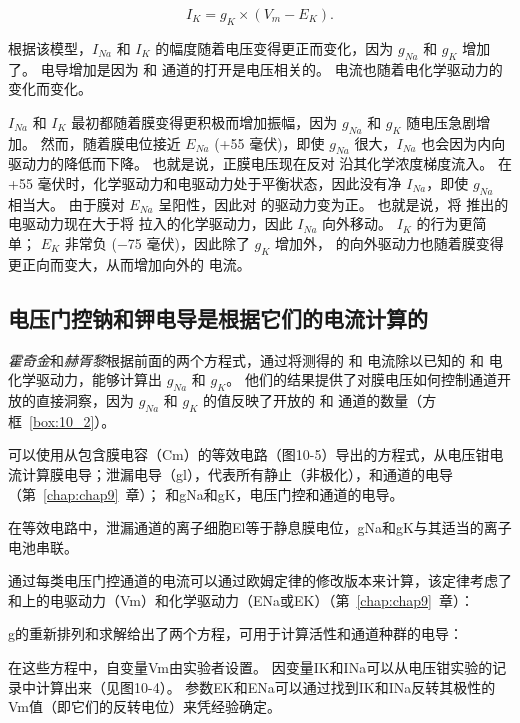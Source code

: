 \begin{equation}
	I_K = g_K \times (V_m - E_K).
\end{equation}


根据该模型，$I_{Na}$ 和 $I_K$ 的幅度随着电压变得更正而变化，因为 $g_{Na}$ 和 $g_K$ 增加了。
电导增加是因为  和  通道的打开是电压相关的。
电流也随着电化学驱动力的变化而变化。


$I_{Na}$ 和 $I_K$ 最初都随着膜变得更积极而增加振幅，因为 $g_{Na}$ 和 $g_K$ 随电压急剧增加。
然而，随着膜电位接近 $E_{Na}$ (+55 毫伏)，即使 $g_{Na}$ 很大，$I_{Na}$ 也会因为内向驱动力的降低而下降。
也就是说，正膜电压现在反对  沿其化学浓度梯度流入。
在 +55 毫伏时，化学驱动力和电驱动力处于平衡状态，因此没有净 $I_{Na}$，即使 $g_{Na}$ 相当大。
由于膜对 $E_{Na}$ 呈阳性，因此对  的驱动力变为正。 
也就是说，将  推出的电驱动力现在大于将  拉入的化学驱动力，因此 $I_{Na}$ 向外移动。
$I_K$ 的行为更简单；
$E_K$ 非常负 (−75 毫伏)，因此除了 $g_K$ 增加外， 的向外驱动力也随着膜变得更正向而变大，从而增加向外的  电流。



\subsection{电压门控钠和钾电导是根据它们的电流计算的}

\textit{霍奇金}和\textit{赫胥黎}根据前面的两个方程式，通过将测得的  和  电流除以已知的  和  电化学驱动力，能够计算出 $g_{Na}$ 和 $g_K$。
他们的结果提供了对膜电压如何控制通道开放的直接洞察，因为 $g_{Na}$ 和 $g_K$ 的值反映了开放的  和  通道的数量（方框~\ref{box:10_2}）。


\begin{proposition}[从电压钳数据计算膜电导] \label{box:10_2}
	
	\quad \quad 可以使用从包含膜电容（Cm）的等效电路（图10-5）导出的方程式，从电压钳电流计算膜电导；泄漏电导（gl），代表所有静止（非极化），和通道的电导（第~\ref{chap:chap9}~章）；
	和gNa和gK，电压门控和通道的电导。
	
	\quad \quad 在等效电路中，泄漏通道的离子细胞El等于静息膜电位，gNa和gK与其适当的离子电池串联。
	
	\quad \quad 通过每类电压门控通道的电流可以通过欧姆定律的修改版本来计算，该定律考虑了和上的电驱动力（Vm）和化学驱动力（ENa或EK）（第~\ref{chap:chap9}~章）：
	
	\quad \quad g的重新排列和求解给出了两个方程，可用于计算活性和通道种群的电导：
	
	\quad \quad 在这些方程中，自变量Vm由实验者设置。
	因变量IK和INa可以从电压钳实验的记录中计算出来（见图10-4）。
	参数EK和ENa可以通过找到IK和INa反转其极性的Vm值（即它们的反转电位）来凭经验确定。
	
\end{proposition}



